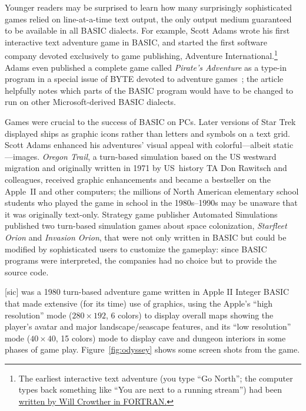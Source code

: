 Younger readers may be surprised to learn how many 
surprisingly sophisticated games relied on line-at-a-time text output,
the only output medium guaranteed to be available in all BASIC dialects.
For example, Scott Adams wrote his first interactive text adventure game
in BASIC, and started
the first software company devoted exclusively to game publishing,
Adventure International.\footnote{The earliest interactive text adventure (you type
``Go North''; the computer types back something like ``You are next to a
running stream'') had been
\href{https://armandofox.blogspot.com/2007/08/the-original-original-adventure.html}{written by Will Crowther in FORTRAN.}}
Adams even published a complete game called \emph{Pirate's Adventure} as
a type-in program in a special issue of BYTE devoted to adventure
games~\cite{byte80:adventure}; the article helpfully notes which parts
of the BASIC program would have to be changed to run on other
Microsoft-derived BASIC dialects.

Games were crucial to the success of BASIC on PCs.
Later versions of Star Trek displayed ships as graphic icons rather than
letters and symbols on a text grid.
Scott Adams enhanced his adventures' visual appeal with colorful---albeit
static---images.
\emph{Oregon Trail}, a turn-based simulation based on the US westward
migration and originally written in 1971 by US~history TA Don Rawitsch and colleagues,
received graphic enhancements and became
a bestseller on the Apple~II and other computers;
the millions of
North American elementary school students who played the game in school
in the 1980s--1990s
may be unaware that it was originally text-only.
Strategy game publisher
Automated Simulations published two turn-based simulation games about
space colonization,
\emph{Starfleet Orion} and \emph{Invasion Orion}, that were not only
written in BASIC but could be modified by sophisticated users to
customize the gameplay: since BASIC programs were interpreted, the
companies had no choice but to provide the source code.

 [sic] was a 1980 turn-based adventure game
written in Apple II Integer BASIC
that made extensive (for its time) use of
graphics, using the Apple's ``high resolution'' mode ($280\times 192$, 6 colors)
to display overall maps showing the player's
avatar and major landscape/seascape features, and its
``low resolution'' mode ($40\times 40$, 15
colors) mode to display cave and dungeon interiors in some phases of game play.
Figure~\ref{fig:odyssey} shows some screen shots from the game.

